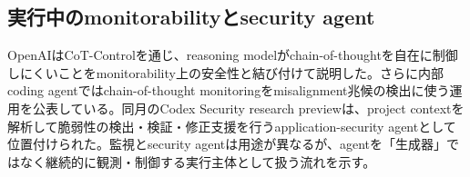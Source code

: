 \begingroup\raggedright
\subsection{実行中のmonitorabilityとsecurity agent}
\par\endgroup

OpenAIはCoT-Controlを通じ、reasoning modelがchain-of-thoughtを自在に制御しにくいことをmonitorability上の安全性と結び付けて説明した。さらに内部coding agentではchain-of-thought monitoringをmisalignment兆候の検出に使う運用を公表している。同月のCodex Security research previewは、project contextを解析して脆弱性の検出・検証・修正支援を行うapplication-security agentとして位置付けられた。監視とsecurity agentは用途が異なるが、agentを「生成器」ではなく継続的に観測・制御する実行主体として扱う流れを示す。\autocite{src-287a6bf67154,src-5becf449a527,src-b4b340379768}



